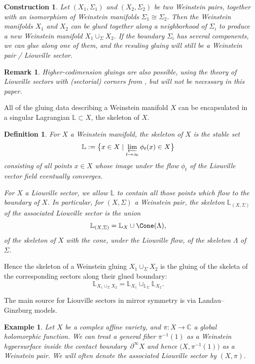 \documentclass[pdftex]{sigma}%
\numberwithin{equation}{section}
\newtheorem{Construction}[Theorem]{Construction}
\newtheorem{Definition}[Theorem]{Definition}
\newtheorem{Example}[Theorem]{Example}
\newtheorem{Remark}[Theorem]{Remark} }
\def\CC{\mathbb{C}}
\def\LL{\mathbb{L}}
\begin{document}
\begin{Construction}
 Let $(X_1,\Sigma_1)$ and $(X_2,\Sigma_2)$ be two Weinstein pairs, together with an isomorphism of Weinstein manifolds $\Sigma_1\cong \Sigma_2$. Then the Weinstein manifolds $X_1$ and $X_2$ can be glued together along a neighborhood of $\Sigma_i$ to produce a new Weinstein manifold $X_1\cup_\Sigma X_2$. If the boundary $\Sigma_i$ has several components, we can glue along one of them, and the resuling gluing will still be a Weinstein pair / Liouville sector.
\end{Construction}
\begin{Remark}
 Higher-codimension gluings are also possible, using the theory of Liouville sectors with (sectorial) corners from \cite{GPS2}, but will not be necessary in this paper.
\end{Remark}

All of the gluing data describing a Weinstein manifold $X$ can be encapsulated in a singular Lagrangian $\LL\subset X$, the skeleton of $X$.
\begin{Definition}
 For $X$ a Weinstein manifold, the {\em skeleton} of $X$ is the stable set
 \[
 \LL := \big\{x\in X\mid \varprojlim_{t\to \infty}\phi_t(x) \in X\big\}
 \]
 consisting of all points $x\in X$ whose image under the flow $\phi_t$ of the Liouville vector field eventually converges.

 For $X$ a Liouville sector, we allow $\LL$ to contain all those points which flow to the boundary of $X$.
	In particular, for $(X,\Sigma)$ a Weinstein pair, the {\em skeleton} $\LL_{(X,\Sigma)}$ of the associated Liouville sector is the union
 \[\LL_{(X,\Sigma)} = \LL_X\cup \Cone(\Lambda),\]
 of the skeleton of $X$ with the cone, under the Liouville flow, of the skeleton $\Lambda$ of $\Sigma$.
\end{Definition}



Hence the skeleton of a Weinstein gluing $X_1\cup_\Sigma X_2$ is the gluing of the skeleta of the corresponding sectors along their glued boundary:
\[
\LL_{X_1\cup_\Sigma X_2} = \LL_{X_1}\cup_{\LL_{\Sigma}}\LL_{X_2}.
\]

The main source for Liouville sectors in mirror symmetry is via Landau--Ginzburg models.
\begin{Example}
 Let $X$ be a complex affine variety, and $\pi\colon X\to \CC$ a global holomorphic function. We can treat a general fiber $\pi^{-1}(1)$ as a Weinstein hypersurface inside the contact boun\-dary~$\partial^\infty X$ and hence $\big(X,\pi^{-1}(1)\big)$ as a Weinstein pair. We will often denote the associated Liouville sector by $(X,\pi)$.
\end{Example}
\end{document}
